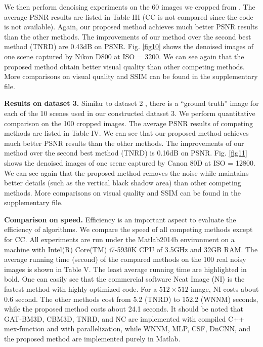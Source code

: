 We then perform denoising experiments on the 60 images we cropped from \cite{crosschannel2016}. The average PSNR results are listed in Table III (CC is not compared since the code is not available). Again, our proposed method achieves much better PSNR results than the other methods. The improvements of our method over the second best method (TNRD) are 0.43dB on PSNR. Fig. \ref{fig10} shows the denoised images of one scene captured by Nikon D800 at ISO = 3200. We can see again that the proposed method obtain better visual quality than other competing methods. More comparisons on visual quality and SSIM can be found in the supplementary file.

\textbf{Results on dataset 3.}
Similar to dataset 2 \cite{crosschannel2016}, there is a ``ground truth'' image for each of the 10 scenes used in our constructed dataset 3. We perform quantitative comparison on the 100 cropped images. The average PSNR results of competing methods are listed in Table IV. We can see that our proposed method achieves much better PSNR results than the other methods. The improvements of our method over the second best method (TNRD) is 0.16dB on PSNR. Fig. \ref{fig11} shows the denoised images of one scene captured by Canon 80D at ISO = 12800. We can see again that the proposed method removes the noise while maintains better details (such as the vertical black shadow area) than other competing methods. More comparisons on visual quality and SSIM can be found in the supplementary file.

\textbf{Comparison on speed.}
Efficiency is an important aspect to evaluate the efficiency of algorithms. We compare the speed of all competing methods except for CC. All experiments are run under the Matlab2014b environment on a machine with Intel(R) Core(TM) i7-5930K CPU of 3.5GHz and 32GB RAM. The average running time (second) of the compared methods on the 100 real noisy images is shown in Table V. The least average running time are highlighted in bold. One can easily see that the commercial software Neat Image (NI) is the fastest method with highly optimized code. For a $512\times512$ image, NI costs about 0.6 second. The other methods cost from 5.2 (TNRD) to 152.2 (WNNM) seconds, while the proposed method costs about 24.1 seconds. It should be noted that GAT-BM3D, CBM3D, TNRD, and NC are implemented with compiled C++ mex-function and with parallelization, while WNNM, MLP, CSF, DnCNN, and the proposed method are implemented purely in Matlab. 


